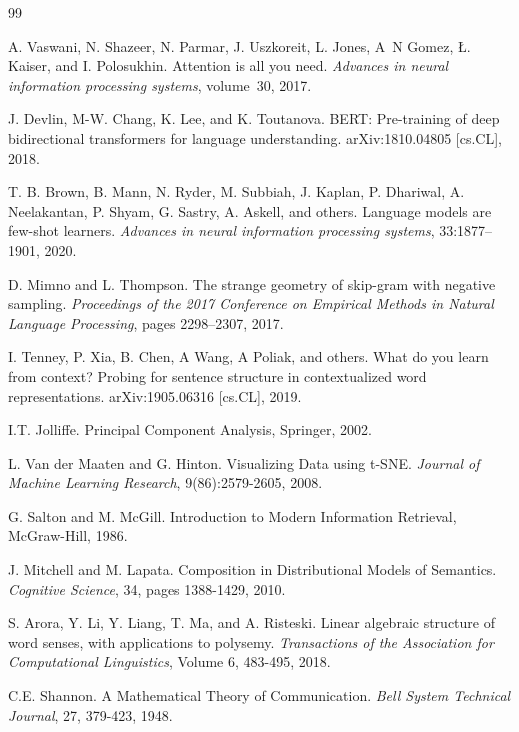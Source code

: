 \documentclass[prd,amsmath,amssymb,12pt]{revtex4}
\begin{document}
\begin{thebibliography}{99}

    A. Vaswani, N. Shazeer, N. Parmar, J. Uszkoreit, L. Jones, A~N Gomez, {\L}. Kaiser, and I. Polosukhin.
    Attention is all you need.
    {\em Advances in neural information processing systems}, volume~30, 2017.

    J. Devlin, M-W. Chang, K. Lee, and K. Toutanova.
    BERT: Pre-training of deep bidirectional transformers for language understanding.
    arXiv:1810.04805 [cs.CL], 2018.

    T. B. Brown, B. Mann, N. Ryder, M. Subbiah, J. Kaplan, P. Dhariwal, A. Neelakantan, P. Shyam, G. Sastry,
    A. Askell, and others.
    Language models are few-shot learners.
    {\em Advances in neural information processing systems}, 33:1877--1901, 2020.

    D. Mimno and L. Thompson.
    The strange geometry of skip-gram with negative sampling.
    {\em Proceedings of the 2017 Conference on Empirical Methods in Natural Language Processing}, pages 2298--2307, 2017.

    I. Tenney, P. Xia, B. Chen, A Wang, A Poliak, and others.
    What do you learn from context? Probing for sentence structure in contextualized word representations.
    arXiv:1905.06316 [cs.CL], 2019.

    I.T. Jolliffe.
    Principal Component Analysis, Springer, 2002.

    L. Van der Maaten and G. Hinton.
    Visualizing Data using t-SNE.
    {\em Journal of Machine Learning Research}, 9(86):2579-2605, 2008.

    G. Salton and M. McGill.
    Introduction to Modern Information Retrieval, McGraw-Hill, 1986.

    J. Mitchell and M. Lapata.
    Composition in Distributional Models of Semantics.
    {\em Cognitive Science}, 34, pages 1388-1429, 2010.

    S. Arora, Y. Li, Y. Liang, T. Ma, and A. Risteski.
    Linear algebraic structure of word senses, with applications to polysemy.
    {\em Transactions of the Association for Computational Linguistics}, Volume 6, 483-495, 2018.

    C.E. Shannon.
    A Mathematical Theory of Communication.
    {\em Bell System Technical Journal}, 27, 379-423, 1948.


\end{thebibliography}
\end{document}
